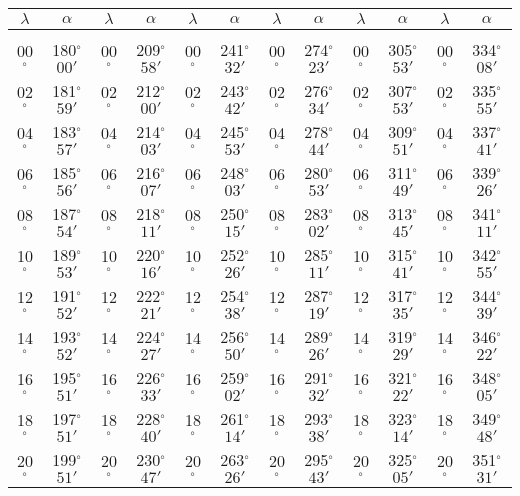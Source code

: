 \begin{table}
{\begin{tabular}{cc|cc|cc|cc|cc|cc}
$\lambda$& $\alpha$& $\lambda$& $\alpha$& $\lambda$& $\alpha$& $\lambda$& $\alpha$& $\lambda$& $\alpha$& $\lambda$& $\alpha$\\\hline
&&&&&&&&&&&\\[-2ex]
00$^\circ$ & 180$^\circ$$00'$ & 00$^\circ$ & 209$^\circ$$58'$ & 00$^\circ$ & 241$^\circ$$32'$ & 00$^\circ$ & 274$^\circ$$23'$ &  00$^\circ$ & 305$^\circ$$53'$ & 00$^\circ$ & 334$^\circ$$08'$\\
02$^\circ$ & 181$^\circ$$59'$ & 02$^\circ$ & 212$^\circ$$00'$ & 02$^\circ$ & 243$^\circ$$42'$ & 02$^\circ$ & 276$^\circ$$34'$ &  02$^\circ$ & 307$^\circ$$53'$ & 02$^\circ$ & 335$^\circ$$55'$\\
04$^\circ$ & 183$^\circ$$57'$ & 04$^\circ$ & 214$^\circ$$03'$ & 04$^\circ$ & 245$^\circ$$53'$ & 04$^\circ$ & 278$^\circ$$44'$ &  04$^\circ$ & 309$^\circ$$51'$ & 04$^\circ$ & 337$^\circ$$41'$\\
06$^\circ$ & 185$^\circ$$56'$ & 06$^\circ$ & 216$^\circ$$07'$ & 06$^\circ$ & 248$^\circ$$03'$ & 06$^\circ$ & 280$^\circ$$53'$ &  06$^\circ$ & 311$^\circ$$49'$ & 06$^\circ$ & 339$^\circ$$26'$\\
08$^\circ$ & 187$^\circ$$54'$ & 08$^\circ$ & 218$^\circ$$11'$ & 08$^\circ$ & 250$^\circ$$15'$ & 08$^\circ$ & 283$^\circ$$02'$ &  08$^\circ$ & 313$^\circ$$45'$ & 08$^\circ$ & 341$^\circ$$11'$\\
10$^\circ$ & 189$^\circ$$53'$ & 10$^\circ$ & 220$^\circ$$16'$ & 10$^\circ$ & 252$^\circ$$26'$ & 10$^\circ$ & 285$^\circ$$11'$ &  10$^\circ$ & 315$^\circ$$41'$ & 10$^\circ$ & 342$^\circ$$55'$\\
12$^\circ$ & 191$^\circ$$52'$ & 12$^\circ$ & 222$^\circ$$21'$ & 12$^\circ$ & 254$^\circ$$38'$ & 12$^\circ$ & 287$^\circ$$19'$ &  12$^\circ$ & 317$^\circ$$35'$ & 12$^\circ$ & 344$^\circ$$39'$\\
14$^\circ$ & 193$^\circ$$52'$ & 14$^\circ$ & 224$^\circ$$27'$ & 14$^\circ$ & 256$^\circ$$50'$ & 14$^\circ$ & 289$^\circ$$26'$ &  14$^\circ$ & 319$^\circ$$29'$ & 14$^\circ$ & 346$^\circ$$22'$\\
16$^\circ$ & 195$^\circ$$51'$ & 16$^\circ$ & 226$^\circ$$33'$ & 16$^\circ$ & 259$^\circ$$02'$ & 16$^\circ$ & 291$^\circ$$32'$ &  16$^\circ$ & 321$^\circ$$22'$ & 16$^\circ$ & 348$^\circ$$05'$\\
18$^\circ$ & 197$^\circ$$51'$ & 18$^\circ$ & 228$^\circ$$40'$ & 18$^\circ$ & 261$^\circ$$14'$ & 18$^\circ$ & 293$^\circ$$38'$ &  18$^\circ$ & 323$^\circ$$14'$ & 18$^\circ$ & 349$^\circ$$48'$\\
20$^\circ$ & 199$^\circ$$51'$ & 20$^\circ$ & 230$^\circ$$47'$ & 20$^\circ$ & 263$^\circ$$26'$ & 20$^\circ$ & 295$^\circ$$43'$ &  20$^\circ$ & 325$^\circ$$05'$ & 20$^\circ$ & 351$^\circ$$31'$\\

\end{tabular}}
\end{table}
